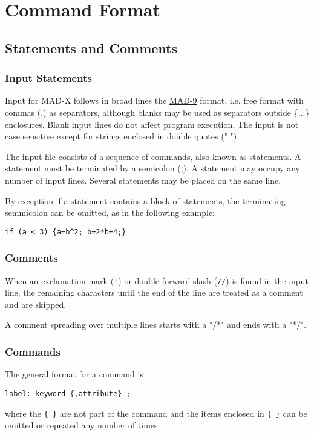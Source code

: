 
\chapter{Command Format}


\section{Statements and Comments}

\subsection{Input Statements}
Input for MAD-X follows in broad lines the
\href{http://cern.ch/mad9}{MAD-9} format, i.e. free format
with commas (,) as separators, although blanks may be used as separators
outside \{...\} enclosures.  
Blank input lines do not affect program execution. 
The input is not case sensitive except for strings enclosed in double
quotes (" "). 

The input file consists of a sequence of commands, also known as
statements. A statement must be terminated by a semicolon (;).
A statement may occupy any number of input lines. 
Several statements may be placed on the same line.

By exception if a statement contains a block of
statements, the terminating semmicolon can be omitted, as in the
following example: 
\begin{verbatim}
if (a < 3) {a=b^2; b=2*b+4;}
\end{verbatim}

\subsection{Comments}
When an exclamation mark ({\tt !}) or double forward slash ({\tt //}) is
found in the input line, the remaining characters until the end of the
line are treated as a comment and are skipped. 

A comment spreading over multiple lines starts with a "/*" and ends with a "*/".

\subsection{Commands}
The general format for a command is 
\begin{verbatim}
label: keyword {,attribute} ;
\end{verbatim}
where the  {\tt \{ \}} are not part of the command and the items
enclosed in {\tt \{ \}} can be omitted or repeated any number of times. 


